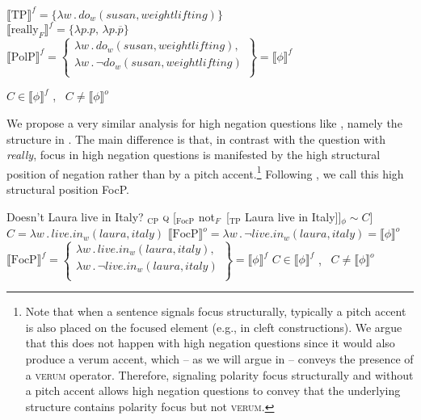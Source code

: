 \documentclass[output=paper,colorlinks,citecolor=brown]{langscibook}
\begin{document}
    \ex $\llbracket \text{TP} \rrbracket^{f} = \{ \lambda w \, . \, do_w(susan, weightlifting) \}$ \\
        $ \llbracket \text{really} _{F} \rrbracket ^f = \{ \lambda p.p, \, \lambda p. \overline p \}$ \\
        $\llbracket \text{PolP} \rrbracket^{f} = \left\{ \begin{array}{l}
            \lambda w \, . \, do_w(susan,weightlifting), \\ 
            \lambda w \, . \,\neg do_w(susan,weightlifting) \\ 
            \end{array} \right\}  = \llbracket \phi \rrbracket^{f} $
        
    \ex $C \in  \llbracket \phi \rrbracket ^f$ \cmark, \, $C \ne \llbracket \phi  \rrbracket ^o$ \cmark
    \z
\z
\il{}

We propose a very similar analysis for high negation questions like , namely the structure in . The main difference is that, in contrast with the question with \textit{really}, focus in high negation questions is manifested by the high structural position of negation rather than by a pitch accent.\footnote{Note that when a sentence signals focus structurally, typically a pitch accent is also placed on the focused element (e.g., in cleft constructions). We argue that this does not happen with high negation questions since it would also produce a verum accent, which -- as we will argue in  -- conveys the presence of a \textsc{verum} operator. Therefore, signaling polarity focus structurally and without a pitch accent allows high negation questions to convey that the underlying structure contains polarity focus but not \textsc{verum}.} Following \citet{rizzi1997}, we call this high structural position FocP.

\is{}
\ea Doesn't Laura live in Italy?\label{HNQ.Anlys}
    \ea {[}$_{\text{CP}}$ \textsc{q} [$_{\text{FocP}}$ not$_{F} \,  $ [$_{\text{TP}}$ Laura live in Italy]]$_{\phi} \sim C$]\label{HNQ.LF}
    \ex $C = \lambda w \, . \, live.in_w(laura,italy)$\label{HNQQ.Anlys.C}
    \ex $\llbracket \text{FocP} \rrbracket^{o} = \lambda w \, . \, \neg                 
        live.in_w(laura,italy) = \llbracket \phi \rrbracket^{o}$ 
    \ex $\llbracket \text{FocP} \rrbracket^{f} = \left\{ \begin{array}{l}
            \lambda w \, . \, live.in_w(laura,italy), \\ 
            \lambda w \, . \,\neg live.in_w(laura,italy) \\ 
            \end{array} \right\} = \llbracket \phi \rrbracket^{f} $
    \ex $C \in  \llbracket \phi \rrbracket ^f$ \cmark, \, $C \ne \llbracket \phi  \rrbracket ^o$ \cmark
    \z
\z
\il{}
\end{document}
